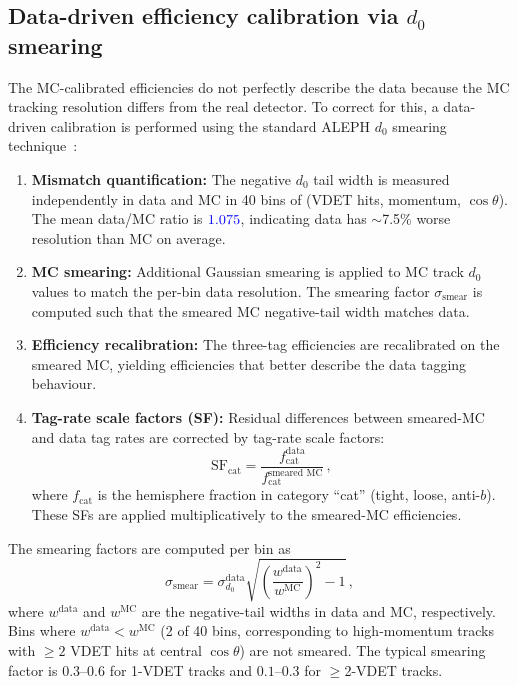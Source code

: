 \documentclass[11pt,a4paper]{article}
\newcommand{\measured}[1]{\textcolor{blue}{#1}}
\begin{document}
\subsection{Data-driven efficiency calibration via $d_0$ smearing}
\label{sec:corrections:smearing}

The MC-calibrated efficiencies do not perfectly describe the data
because the MC tracking resolution differs from the real detector.
To correct for this, a data-driven calibration is performed using
the standard ALEPH $d_0$ smearing
technique~\cite{ALEPH:Rb:precise}:

\begin{enumerate}
\item \textbf{Mismatch quantification:}
  The negative $d_0$ tail width is measured independently in data
  and MC in 40 bins of (VDET hits, momentum, $\cos\theta$).
  The mean data/MC ratio is $\measured{1.075}$, indicating data
  has $\sim$7.5\% worse resolution than MC on average.

\item \textbf{MC smearing:}
  Additional Gaussian smearing is applied to MC track $d_0$ values
  to match the per-bin data resolution. The smearing factor
  $\sigma_\text{smear}$ is computed such that the smeared MC
  negative-tail width matches data.

\item \textbf{Efficiency recalibration:}
  The three-tag efficiencies are recalibrated on the smeared MC,
  yielding efficiencies that better describe the data tagging
  behaviour.

\item \textbf{Tag-rate scale factors (SF):}
  Residual differences between smeared-MC and data tag rates are
  corrected by tag-rate scale factors:
  \begin{equation}
  \text{SF}_\text{cat} = \frac{f_\text{cat}^\text{data}}
    {f_\text{cat}^\text{smeared MC}}\,,
  \label{eq:tag_rate_sf}
  \end{equation}
  where $f_\text{cat}$ is the hemisphere fraction in category
  ``cat'' (tight, loose, anti-$b$).
  These SFs are applied multiplicatively to the smeared-MC
  efficiencies.
\end{enumerate}

The smearing factors are computed per bin as
\begin{equation}
\sigma_\text{smear} = \sigma_{d_0}^\text{data}
\sqrt{\left(\frac{w^\text{data}}{w^\text{MC}}\right)^2 - 1}\,,
\label{eq:smear_factor}
\end{equation}
where $w^\text{data}$ and $w^\text{MC}$ are the negative-tail
widths in data and MC, respectively.
Bins where $w^\text{data} < w^\text{MC}$ (2 of 40 bins,
corresponding to high-momentum tracks with $\geq 2$ VDET hits
at central $\cos\theta$) are not smeared.
The typical smearing factor is $0.3$--$0.6$ for 1-VDET tracks
and $0.1$--$0.3$ for $\geq$2-VDET tracks.
\end{document}
